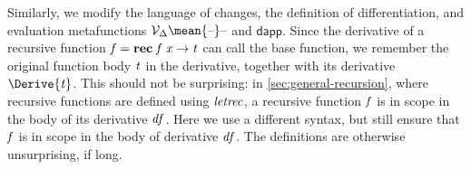 Similarly, we modify the language of changes, the definition of differentiation,
and evaluation metafunctions \ensuremath{\mathcal{V}_{\Delta}\mean{\text{\textendash}}\text{\textendash}} and \ensuremath{\mathsf{dapp}}.
Since the derivative of a recursive function \ensuremath{\Varid{f}\mathrel{=}\mathbf{rec}\;\Varid{f}\;\Varid{x}\to \Varid{t}} can call the base
function, we remember the original function body \ensuremath{\Varid{t}} in the
derivative, together with its derivative \ensuremath{\Derive{\Varid{t}}}. This should not be
surprising: in \cref{sec:general-recursion}, where recursive functions are
defined using \ensuremath{\Varid{letrec}}, a recursive function \ensuremath{\Varid{f}} is in scope in the body of its
derivative \ensuremath{\Varid{df}}. Here we use a different syntax, but still ensure that \ensuremath{\Varid{f}} is in
scope in the body of derivative \ensuremath{\Varid{df}}.
The definitions are otherwise unsurprising, if long.

